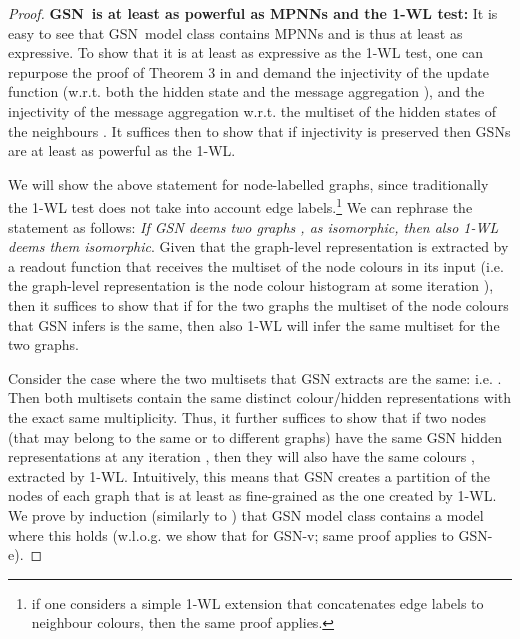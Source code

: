 \documentclass{article} \usepackage{iclr2021_conference,times}
\newcommand{\modelname}{GSN}
\begin{document}
\begin{proof}

\noindent\textbf{{\modelname\ is at least as powerful as MPNNs and the 1-WL test:}} It is easy to see that \modelname\ model class contains MPNNs and is thus at least as expressive.  To show that it is at least as expressive as the 1-WL test, one can repurpose the proof of Theorem 3 in \cite{xu2018how}  and demand the injectivity of the update function (w.r.t. both the hidden state  and the message aggregation ), and the injectivity of the message aggregation w.r.t. the multiset of the hidden states of the neighbours . It suffices then to show that if injectivity is preserved then \modelname s are at least as powerful as the 1-WL.



We will show the above statement for node-labelled graphs, since traditionally the 1-WL test does not take into account edge labels.\footnote{if one considers a simple 1-WL extension that concatenates edge labels to neighbour colours, then the same proof applies.} We can rephrase the statement as follows: \textit{If GSN deems two graphs ,  as isomorphic, then also 1-WL deems them isomorphic}. Given that the graph-level representation is extracted by a readout function that receives the multiset of the node colours in its input (i.e. the graph-level representation is the node colour histogram at some iteration ), then it suffices to show that if for the two graphs the multiset of the node colours that GSN infers is the same, then also 1-WL will infer the same multiset for the two graphs. 

Consider the case where the two multisets that GSN extracts are the same:  i.e. . Then both multisets contain the same distinct colour/hidden representations with the exact same multiplicity. Thus, it further suffices to show that
if two nodes  (that may belong to the same or to different graphs) have the same GSN hidden representations  at any iteration , then they will also have the same colours , extracted by 1-WL. Intuitively, this means that GSN creates a partition of the nodes of each graph that is at least as fine-grained as the one created by 1-WL. We prove by induction (similarly to \cite{xu2018how}) that GSN model class contains a model where this holds (w.l.o.g. we show that for GSN-v; same proof applies to GSN-e).


\end{proof}
\end{document}
